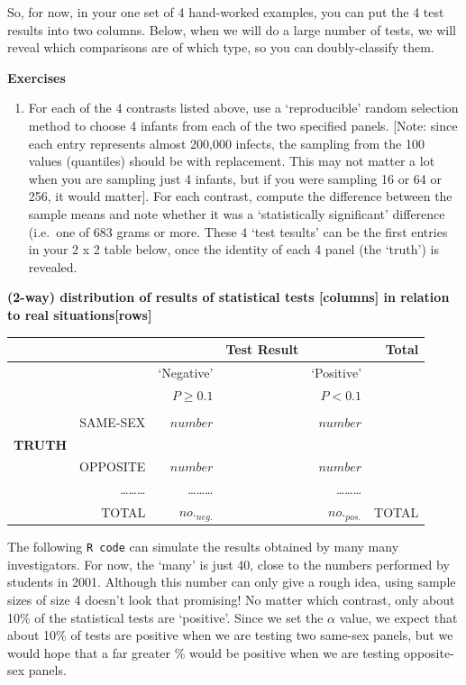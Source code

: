 \documentclass[]{book}
\providecommand{\tightlist}{%
  \setlength{\itemsep}{0pt}\setlength{\parskip}{0pt}}
\begin{document}
So, for now, in your one set of 4 hand-worked examples, you can put the 4 test results into two columns. Below, when we will do a large number of tests, we will reveal which comparisons are of which type, so you can doubly-classify them.

\textbf{Exercises}

\begin{enumerate}
\def\labelenumi{\arabic{enumi}.}
\tightlist
\item
  For each of the 4 contrasts listed above, use a `reproducible' random selection method to choose 4 infants from each of the two specified panels. {[}Note: since each entry represents almost 200,000 infects, the sampling from the 100 values (quantiles) should be with replacement. This may not matter a lot when you are sampling just 4 infants, but if you were sampling 16 or 64 or 256, it would matter{]}. For each contrast, compute the difference between the sample means and note whether it was a `statistically significant' difference (i.e.~one of 683 grams or more. These 4 `test tesults' can be the first entries in your 2 x 2 table below, once the identity of each 4 panel (the `truth') is revealed.
\end{enumerate}

\textbf{(2-way) distribution of results of statistical tests {[}columns{]} in relation to real situations{[}rows{]}}

\begin{longtable}[]{@{}lrrrrr@{}}
\toprule
& & & Test Result & & Total\tabularnewline
\midrule
\endhead
& & `Negative' & & `Positive' &\tabularnewline
& & \(P \ge 0.1\) & & \(P \lt 0.1\) &\tabularnewline
& & & & &\tabularnewline
& SAME-SEX & \(number\) & & \(number\) &\tabularnewline
\textbf{TRUTH} & & & & &\tabularnewline
& OPPOSITE & \(number\) & & \(number\) &\tabularnewline
& \ldots{}\ldots{}\ldots{} & \ldots{}\ldots{}\ldots{} & & \ldots{}\ldots{}\ldots{} &\tabularnewline
& TOTAL & \(no._{neg.}\) & & \(no._{pos.}\) & TOTAL\tabularnewline
\bottomrule
\end{longtable}

The following \texttt{R\ code} can simulate the results obtained by many many investigators. For now, the `many' is just 40, close to the numbers performed by students in 2001. Although this number can only give a rough idea, using sample sizes of size 4 doesn't look that promising! No matter which contrast, only about 10\% of the statistical tests are `positive'. Since we set the \(\alpha\) value, we expect that about 10\% of tests are positive when we are testing two same-sex panels, but we would hope that a far greater \% would be positive when we are testing opposite-sex panels.
\end{document}
